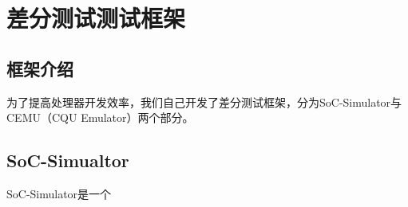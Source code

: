 \chapter{差分测试测试框架}

\section{框架介绍}

为了提高处理器开发效率，我们自己开发了差分测试框架，分为SoC-Simulator与CEMU（CQU Emulator）两个部分。

\section{SoC-Simualtor}

SoC-Simulator是一个